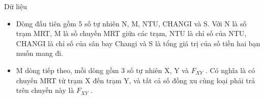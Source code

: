 Dữ liệu  
\begin{itemize}
	\item     Dòng đầu tiên gồm 5 số tự nhiên N, M, NTU, CHANGI và S. Với N là số trạm MRT, M là số chuyến MRT giữa các trạm, NTU là chỉ số của NTU, CHANGI là chỉ số của sân bay Changi và S là tổng giá trị của số tiền hai bạn muốn mang đi.   
	\item     M dòng tiếp theo, mỗi dòng gồm 3 số tự nhiên X, Y và $F_{XY}$    . Có nghĩa là có chuyến MRT từ trạm X đến trạm Y, và tất cả số đồng xu cùng loại phải trả trên chuyến này là $F_{XY}$    .   
\end{itemize}